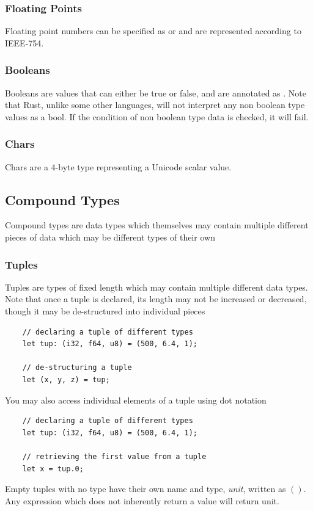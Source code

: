 \documentclass[]{article}
\begin{document}
\subsubsection{Floating Points}

Floating point numbers can be specified as  or  and are represented according to IEEE-754.
\subsubsection{Booleans}

Booleans are values that can either be true or false, and are annotated as .
Note that Rust, unlike some other languages, will not interpret any non boolean type values as a bool.
If the condition of non boolean type data is checked, it will fail.
\subsubsection{Chars}

Chars are a 4-byte type representing a Unicode scalar value.
\subsection{Compound Types}

Compound types are data types which themselves may contain multiple different pieces of data which may be different types of their own
\subsubsection{Tuples}

Tuples are types of fixed length which may contain multiple different data types.
Note that once a tuple is declared, its length may not be increased or decreased, though it may be de-structured into individual pieces
\begin{verbatim}
    // declaring a tuple of different types
    let tup: (i32, f64, u8) = (500, 6.4, 1);
    
    // de-structuring a tuple
    let (x, y, z) = tup;
\end{verbatim}
\pagebreak
You may also access individual elements of a tuple using dot notation
\begin{verbatim}
    // declaring a tuple of different types
    let tup: (i32, f64, u8) = (500, 6.4, 1);
    
    // retrieving the first value from a tuple
    let x = tup.0;
\end{verbatim}
Empty tuples with no type have their own name and type, \emph{unit}, written as $()$.
Any expression which does not inherently return a value will return unit.
\end{document}
